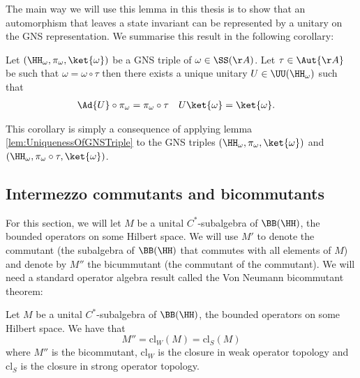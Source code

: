 The main way we will use this lemma in this thesis is to show that an automorphism that leaves a state invariant can be represented by a unitary on the GNS representation. We summarise this result in the following corollary:
\begin{corollary}\label{cor:OneStateHasUnitarilyEquivalentGNSTriples}
	Let $(\HH_\omega,\pi_\omega,\ket{\omega})$ be a GNS triple of $\omega\in\SS(\AA)$. Let $\tau\in\Aut{\AA}$ be such that $\omega=\omega\circ\tau$ then there exists a unique unitary $U\in\UU(\HH_\omega)$ such that
	\begin{align}
	\Ad{U}\circ\pi_\omega&=\pi_\omega\circ\tau&U\ket{\omega}&=\ket{\omega}.
	\end{align}
\end{corollary}
This corollary is simply a consequence of applying lemma \ref{lem:UniquenessOfGNSTriple} to the GNS triples $(\HH_\omega,\pi_\omega,\ket{\omega})$ and $(\HH_\omega,\pi_\omega\circ\tau,\ket{\omega})$.
\subsection{Intermezzo commutants and bicommutants}
For this section, we will let $M$ be a unital $C^*$-subalgebra of $\BB(\HH)$, the bounded operators on some Hilbert space. We will use $M'$ to denote the commutant (the subalgebra of $\BB(\HH)$ that commutes with all elements of $M$) and denote by $M''$ the bicummutant (the commutant of the commutant). We will need a standard operator algebra result called the Von Neumann bicommutant theorem:
\begin{definition}
	Let $M$ be a unital $C^*$-subalgebra of $\BB(\HH)$, the bounded operators on some Hilbert space. We have that
	\begin{equation}
	M''=\text{cl}_W(M)=\text{cl}_S(M)
	\end{equation}
	where $M''$ is the bicommutant, $\text{cl}_W$ is the closure in weak operator topology and $\text{cl}_S$ is the closure in strong operator topology.
\end{definition}
